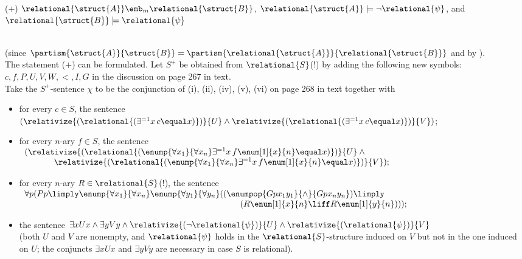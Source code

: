 \begin{enumerate}[1.]
\begin{quoteno}{($+$)}
$\relational{\struct{A}} \emb_m \relational{\struct{B}}$, $\relational{\struct{A}} \models \neg\relational{\psi}$, and $\relational{\struct{B}} \models \relational{\psi}$
\end{quoteno}\smallskip\\
(since $\partism{\struct{A}}{\struct{B}} = \partism{\relational{\struct{A}}}{\relational{\struct{B}}}$ and by ).\bigskip\\
The statement ($+$) can be formulated. Let $S^+$ be obtained from $\relational{S}$(!) by adding the following new symbols: $c, f, P, U, V, W, < , I, G$ in the discussion on page 267 in text.\bigskip\\
Take the $S^+$-sentence $\chi$ to be the conjunction of (i), (ii), (iv), (v), (vi) on page 268 in text together with
\begin{itemize}
\item for every $c \in S$, the sentence $(\relativize{(\relational{(\exists^{=1}x \, c \equal x)})}{U} \land \relativize{(\relational{(\exists^{=1}x \, c \equal x)})}{V})$;
\item for every $n$-ary $f \in S$, the sentence\\
$\begin{array}{r}
(\relativize{(\relational{(\enump{\forall x_1}{\forall x_n}\exists^{=1}x \, f\enum[1]{x}{n} \equal x)})}{U} \land \phantom{aaaaa}\\
\relativize{(\relational{(\enump{\forall x_1}{\forall x_n}\exists^{=1}x \, f\enum[1]{x}{n} \equal x)})}{V});
\end{array}$
\item for every $n$-ary $R \in \relational{S}$(!), the sentence\\
$\begin{array}{r}
\forall p (Pp \limply \enump{\forall x_1}{\forall x_n} \enump{\forall y_1}{\forall y_n} ((\enumpop{Gpx_1y_1}{\land}{Gpx_ny_n}) \limply \phantom{aaaaa}\\
(R\enum[1]{x}{n} \liff R\enum[1]{y}{n})));
\end{array}$
\item the sentence $\exists x Ux \land \exists y Vy \land \relativize{(\neg\relational{\psi})}{U} \land \relativize{(\relational{\psi})}{V}$\\(both $U$ and $V$ are nonempty, and $\relational{\psi}$ holds in the $\relational{S}$-structure induced on $V$ but not in the one induced on $U$; the conjuncts $\exists x Ux$ and $\exists y Vy$ are necessary in case $S$ is relational).

\end{itemize}
\end{enumerate}
